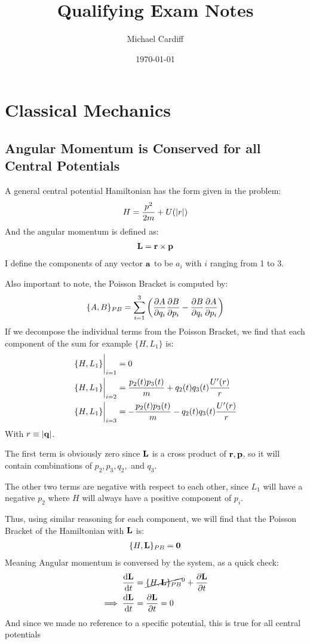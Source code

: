 \documentclass[12pt]{article}
\title{\vspace{-3em}Qualifying Exam Notes}
\author{Michael Cardiff}
\date{\today}
\theoremstyle{plain}
\theoremstyle{definition}
\begin{document}
\maketitle
\tableofcontents
\newpage
\section{Classical Mechanics}

\subsection{Angular Momentum is Conserved for all Central Potentials}
A general central potential Hamiltonian has the form given in the problem:
\begin{align*}
  H=\frac{p^2}{2m}+U(\abs{r})
\end{align*}
And the angular momentum is defined as:
\begin{align*}
  \vb{L}=\vb{r}\times\vb{p}
\end{align*}
I define the components of any vector $\vb{a}$ to be $a_i$ with $i$ ranging from 1 to 3.

Also important to note, the Poisson Bracket is computed by:
\begin{align*}
  \{A,B\}_{PB}=
  \sum_{i=1}^3\qty(\pdv{A}{q_i}\pdv{B}{p_i}-\pdv{B}{q_i}\pdv{A}{p_i})
\end{align*}
If we decompose the individual terms from the Poisson Bracket, we find that each component of the sum for example $\{H,L_1\}$ is:
\begin{align*}
  \eval{\{H,L_1\}}_{i=1}&=
  0 \\
  \eval{\{H,L_1\}}_{i=2}&=
  \frac{p_2(t) p_3(t)}{m}+q_2(t) q_3(t)\frac{U'(r)}{r} \\
  \eval{\{H,L_1\}}_{i=3}&=-\frac{p_2(t) p_3(t)}{m}-q_2(t) q_3(t)\frac{U'(r)}{r}
\end{align*}
With $r\equiv\abs{\vb{q}}$.

The first term is obviously zero since $\vb{L}$ is a cross product of $\vb{r,p}$, so it will contain combinations of $p_2,p_3,q_2,$ and $q_3$.

The other two terms are negative with respect to each other, since $L_1$ will have a negative $p_2$ where $H$ will always have a positive component of $p_i$.

Thus, using similar reasoning for each component, we will find that the Poisson Bracket of the Hamiltonian with $\vb{L}$ is:
\begin{align*}
  \{H,\vb{L}\}_{PB}=\vb{0}
\end{align*}
Meaning Angular momentum is conversed by the system, as a quick check:
\begin{align*}
  \dv{\vb{L}}{t}&=\cancel{\{H,\vb{L}\}_{PB}}^0+\pdv{\vb{L}}{t}\\
  \implies\dv{\vb{L}}{t}&=\pdv{\vb{L}}{t}=0
\end{align*}
And since we made no reference to a specific potential, this is true for all central potentials
\end{document}

